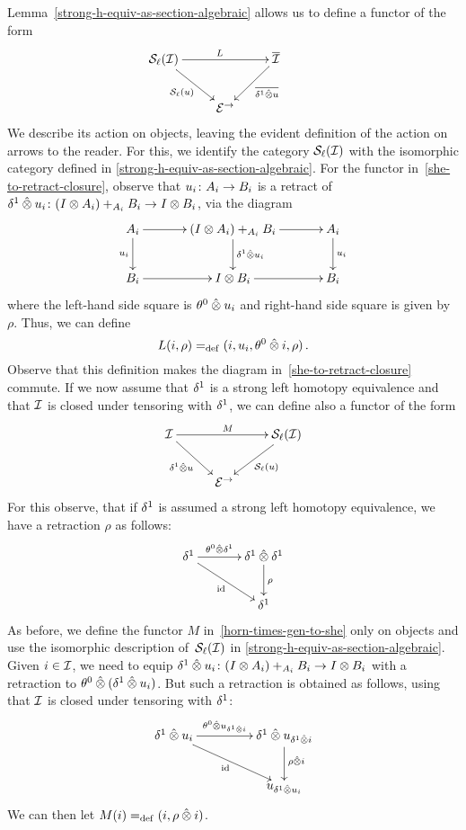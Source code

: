 \documentclass[reqno,10pt,a4paper,oneside]{amsart}
\begin{document}
Lemma~\ref{strong-h-equiv-as-section-algebraic} allows us to define a functor of the form
\begin{equation}
\xycenter{
\cal{S}_\ell(\cal{I})  \ar[dr]_{\cal{S}_\ell(u)} \ar[rr]^L & & \overline{\cal{I}} \ar[dl]^-{\overline{\rcyl \hatotimes u}} \\
  & \catE^{\to} & } \qquad \quad \label{she-to-retract-closure}  
  \end{equation}
We describe its action on objects, leaving the evident definition of the action on arrows to the
reader. For this, we identify the category $\cal{S}_\ell(\cal{I})$ with the isomorphic category defined
in \cref{strong-h-equiv-as-section-algebraic}. For the functor in~\eqref{she-to-retract-closure}, observe that $u_i \co A_i \to B_i$ is a retract 
of~$\rcyl \hatotimes u_i \co (\interval \otimes A_i) +_{A_i} B_i \to \interval \otimes B_i$, via the diagram
\[
\xymatrix@C+1em{
 A_i \ar[d]_{u_i} \ar[r] & (\interval \otimes A_i) +_{A_i} B_i \ar[r] \ar[d]^{\rcyl \hatotimes u_i } & A_i \ar[d]^{u_i} \\
 B_i \ar[r] & \interval \otimes B_i \ar[r] & B_i }
\]
where the left-hand side square is $\thetal \hatotimes u_i$ and right-hand side square is given by $\rho$. Thus, we can define 
\[
L(i, \rho) \defeq (i, u_i, \thetal \hatotimes i, \rho) \, .
\]
Observe that this definition makes the diagram in~\eqref{she-to-retract-closure} commute. If we now assume that 
$\rcyl$ is a strong left homotopy equivalence and that $\cal{I}$ is closed under tensoring with $\rcyl$, we can define
also a functor of the form
\begin{equation}
  \label{horn-times-gen-to-she}
\xycenter{
 \cal{I} \ar[dr]_{\rcyl \hatotimes u} \ar[rr]^M & & \cal{S}_\ell(\cal{I}) \ar[dl]^{\cal{S}_\ell(u)} \\ 
 & \ \catE^\to & }
 \end{equation}
For this observe, that if $\rcyl$ is assumed a strong left homotopy equivalence, we have a retraction $\rho$ as follows:
\[
\xymatrix@C+1em{
  \rcyl
  \ar[r]^-{\thetal \hatotimes \rcyl}
  \ar[dr]_{\id}
&
  \rcyl \hatotimes \rcyl \ar[d]^{\rho}
\\&
  \rcyl
}
\]
As before, we  define the functor $M$ in~\eqref{horn-times-gen-to-she} only on objects and use the isomorphic description
of~$\cal{S}_\ell(\cal{I})$ in \cref{strong-h-equiv-as-section-algebraic}. Given $i \in \cal{I}$, we need to equip 
$\rcyl \hatotimes u_i \co (\interval \otimes A_i) +_{A_i} B_i \to \interval \otimes B_i$
with a retraction to $\thetal \hatotimes (\rcyl \hatotimes u_i)$. But such a retraction is obtained as follows, 
using that $\cal{I}$ is closed under tensoring with $\rcyl$:
\[
\xymatrix@C+2em{
 \rcyl \hatotimes u_{i}
  \ar[r]^-{\thetal \hatotimes u_{\rcyl \hatotimes i}}
  \ar[dr]_{\id}
&
  \rcyl \hatotimes u_{\rcyl \hatotimes i} 
  \ar[d]^{\rho \hatotimes i}
\\&
  u_{\rcyl \hatotimes u_i}
  }
\]
We can then let $M(i) \defeq (i, \rho \hatotimes i)$.
\end{document}
